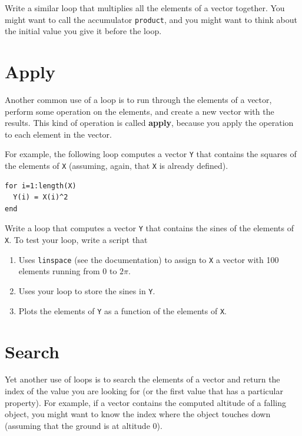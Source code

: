 \documentclass{book}
\begin{document}
\begin{ex}
Write a similar loop that multiplies all the
elements of a vector together. You might want to call the
accumulator {\tt product}, and you might want to think about 
the initial value you give it before the loop.
\end{ex}


\section{Apply}
\label{apply}

Another common use of a loop is to run through the elements of
a vector, perform some operation on the elements, and create
a new vector with the results. This kind of operation is called
{\bf apply}, because you apply the operation to each element in
the vector.

For example, the following loop computes a vector {\tt Y} that
contains the squares of the elements of {\tt X} (assuming, again,
that {\tt X} is already defined).

\begin{verbatim}
for i=1:length(X)
  Y(i) = X(i)^2
end
\end{verbatim}

\begin{ex}
Write a loop that computes a vector {\tt Y} that
contains the sines of the elements of {\tt X}. To test your
loop, write a script that

\begin{enumerate}

\item Uses {\tt linspace} (see the documentation) to assign
to {\tt X} a vector with 100 elements running from 0 to $2 \pi$.

\item Uses your loop to store the sines in {\tt Y}.

\item Plots the elements of {\tt Y} as a function of the elements
of {\tt X}.

\end{enumerate}
\end{ex}

\section{Search}
\label{search}

Yet another use of loops is to search the elements of a vector
and return the index of the value you are looking for (or the
first value that has a particular property). For example, if
a vector contains the computed altitude of a falling object, you
might want to know the index where the object touches down (assuming
that the ground is at altitude 0).
\end{document}
